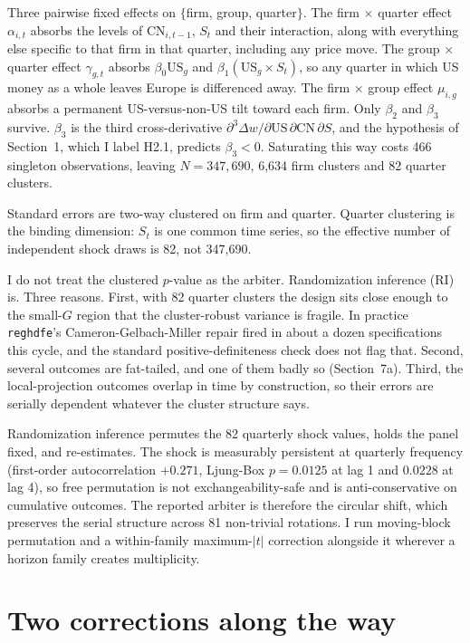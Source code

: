 \documentclass[11pt]{article}
\begin{document}
Three pairwise fixed effects on $\{$firm, group, quarter$\}$. The firm
$\times$ quarter effect $\alpha_{i,t}$ absorbs the levels of
$\mathrm{CN}_{i,t-1}$, $S_t$ and their interaction, along with everything else
specific to that firm in that quarter, including any price move. The group
$\times$ quarter effect $\gamma_{g,t}$ absorbs $\beta_0 \mathrm{US}_g$ and
$\beta_1 (\mathrm{US}_g \times S_t)$, so any
quarter in which US money as a whole leaves Europe is differenced away. The
firm $\times$ group effect $\mu_{i,g}$ absorbs a permanent US-versus-non-US
tilt toward each firm. Only $\beta_2$ and $\beta_3$ survive. $\beta_3$ is the
third cross-derivative $\partial^3 \Delta w / \partial \mathrm{US} \,
\partial \mathrm{CN} \, \partial S$, and the hypothesis of Section~1, which I
label H2.1, predicts $\beta_3 < 0$. Saturating this way costs 466
singleton observations, leaving $N = 347{,}690$, 6,634 firm clusters and 82
quarter clusters.

Standard errors are two-way clustered on firm and quarter. Quarter clustering
is the binding dimension: $S_t$ is one common time series, so the effective
number of independent shock draws is 82, not 347,690.

I do not treat the clustered $p$-value as the arbiter. Randomization inference
(RI) is. Three reasons. First, with 82 quarter clusters the design sits close
enough to the small-$G$ region that the cluster-robust variance is fragile. In
practice \texttt{reghdfe}'s Cameron-Gelbach-Miller repair fired in about a
dozen specifications this cycle, and the standard positive-definiteness check
does not flag that. Second, several outcomes are fat-tailed, and one of them
badly so (Section~7a). Third, the local-projection outcomes overlap in time by
construction, so their errors are serially dependent whatever the cluster
structure says.

Randomization inference permutes the 82 quarterly shock values, holds the
panel fixed, and re-estimates. The shock is measurably persistent at quarterly
frequency (first-order autocorrelation $+0.271$, Ljung-Box $p = 0.0125$ at lag
1 and $0.0228$ at lag 4), so free permutation is not exchangeability-safe and
is anti-conservative on cumulative outcomes. The reported arbiter is therefore
the circular shift, which preserves the serial structure across 81 non-trivial
rotations. I run moving-block permutation and a within-family maximum-$|t|$
correction alongside it wherever a horizon family creates multiplicity.

\section{Two corrections along the way}
\end{document}
